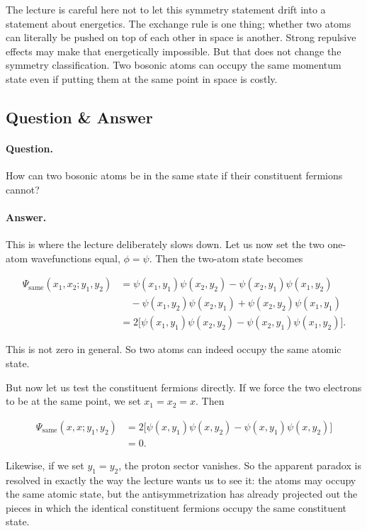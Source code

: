The lecture is careful here not to let this symmetry statement drift into a statement about energetics. The exchange rule is one thing; whether two atoms can literally be pushed on top of each other in space is another. Strong repulsive effects may make that energetically impossible. But that does not change the symmetry classification. Two bosonic atoms can occupy the same momentum state even if putting them at the same point in space is costly.

\subsection{Question \& Answer}

\paragraph{Question.} How can two bosonic atoms be in the same state if their constituent fermions cannot?

\paragraph{Answer.} This is where the lecture deliberately slows down. Let us now set the two one-atom wavefunctions equal, \(\phi=\psi\). Then the two-atom state becomes

\begin{align}
\Psi_{\mathrm{same}}(x_1,x_2;y_1,y_2)
&=
\psi(x_1,y_1)\psi(x_2,y_2)
-\psi(x_2,y_1)\psi(x_1,y_2)\nonumber\\
&\quad
-\psi(x_1,y_2)\psi(x_2,y_1)
+\psi(x_2,y_2)\psi(x_1,y_1)\\
&=
2\Big[\psi(x_1,y_1)\psi(x_2,y_2)-\psi(x_2,y_1)\psi(x_1,y_2)\Big].
\end{align}

This is not zero in general. So two atoms can indeed occupy the same atomic state.

But now let us test the constituent fermions directly. If we force the two electrons to be at the same point, we set \(x_1=x_2=x\). Then

\begin{align}
\Psi_{\mathrm{same}}(x,x;y_1,y_2)
&=
2\Big[\psi(x,y_1)\psi(x,y_2)-\psi(x,y_1)\psi(x,y_2)\Big]\\
&=0.
\end{align}

Likewise, if we set \(y_1=y_2\), the proton sector vanishes. So the apparent paradox is resolved in exactly the way the lecture wants us to see it: the atoms may occupy the same atomic state, but the antisymmetrization has already projected out the pieces in which the identical constituent fermions occupy the same constituent state.

